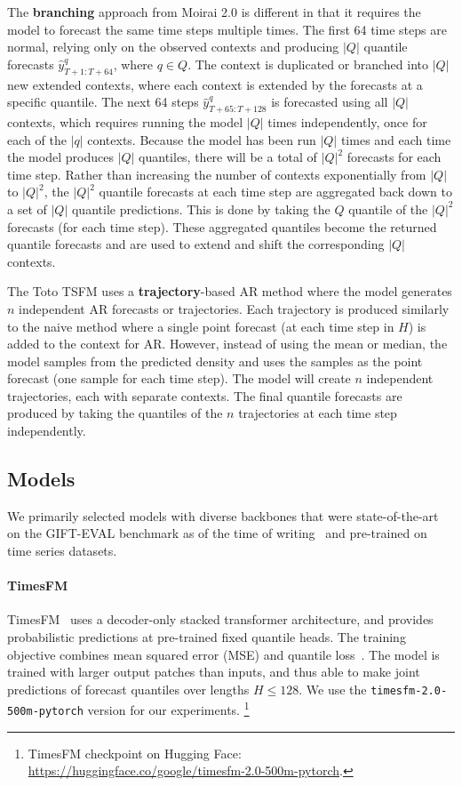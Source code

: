 \documentclass{article}
\begin{document}
The \textbf{branching} approach from Moirai 2.0 is different in that it requires the model to forecast the same time steps multiple times.
The first 64 time steps are normal, relying only on the observed contexts and producing $|Q|$ quantile forecasts $\hat{y}^q_{T+1:T+64}$, where $q \in Q$.
The context is duplicated or branched into $|Q|$ new extended contexts, where each context is extended by the forecasts at a specific quantile. 
The next 64 steps $\hat{y}^q_{T+65:T+128}$ is forecasted using all $|Q|$ contexts, which requires running the model $|Q|$ times independently, once for each of the $|q|$ contexts.
Because the model has been run $|Q|$ times and each time the model produces $|Q|$ quantiles, there will be a total of $|Q|^2$ forecasts for each time step.
Rather than increasing the number of contexts exponentially from $|Q|$ to $|Q|^2$, the $|Q|^2$ quantile forecasts at each time step are aggregated back down to a set of $|Q|$ quantile predictions.
This is done by taking the $Q$ quantile of the $|Q|^2$ forecasts (for each time step).
These aggregated quantiles become the returned quantile forecasts and are used to extend and shift the corresponding $|Q|$ contexts.

The Toto TSFM \citep{toto} uses a \textbf{trajectory}-based AR method where the model generates $n$ independent AR forecasts or trajectories.
Each trajectory is produced similarly to the naive method where a single point forecast (at each time step in $H$) is added to the context for AR.
However, instead of using the mean or median, the model samples from the predicted density and uses the samples as the point forecast (one sample for each time step).
The model will create $n$ independent trajectories, each with separate contexts.
The final quantile forecasts are produced by taking the quantiles of the $n$ trajectories at each time step independently.


\subsection{Models}\label{sec:appendix:models}
We primarily selected models with diverse backbones that were state-of-the-art on the GIFT-EVAL benchmark as of the time of writing~\citep{gifteval} and pre-trained on time series datasets.

\paragraph{TimesFM} 
TimesFM~\citep{timesfm} uses a decoder-only stacked transformer architecture, and provides probabilistic predictions at pre-trained fixed quantile heads. 
The training objective combines mean squared error (MSE) and quantile loss~\cite{forecasttextbook,probforcasttext}. 
The model is trained with larger output patches than inputs, and thus able to make joint predictions of forecast quantiles over lengths $H\leq128$.
We use the \texttt{timesfm-2.0-500m-pytorch} version for our experiments. \footnote{TimesFM checkpoint on Hugging Face: \url{https://huggingface.co/google/timesfm-2.0-500m-pytorch}.}
\end{document}
